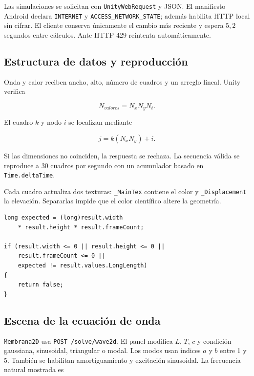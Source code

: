 Las simulaciones se solicitan con \texttt{UnityWebRequest} y JSON. El manifiesto
Android declara \texttt{INTERNET} y \texttt{ACCESS\_NETWORK\_STATE}; además habilita
HTTP local sin cifrar. El cliente conserva únicamente el cambio más reciente y espera
$5{,}2$ segundos entre cálculos. Ante HTTP 429 reintenta automáticamente.

\subsection{Estructura de datos y reproducción}

Onda y calor reciben ancho, alto, número de cuadros y un arreglo lineal. Unity verifica

\begin{equation}
N_{valores}=N_xN_yN_t.
\end{equation}

El cuadro $k$ y nodo $i$ se localizan mediante

\begin{equation}
j=k(N_xN_y)+i.
\end{equation}

Si las dimensiones no coinciden, la respuesta se rechaza. La secuencia válida se
reproduce a 30 cuadros por segundo con un acumulador basado en
\texttt{Time.\allowbreak deltaTime}.

Cada cuadro actualiza dos texturas: \texttt{\_MainTex} contiene el color y
\texttt{\_Displacement} la elevación. Separarlas impide que el color científico altere
la geometría.

\begin{lstlisting}[style=csharp, caption={Validación de una grilla recibida.}]
long expected = (long)result.width
    * result.height * result.frameCount;

if (result.width <= 0 || result.height <= 0 ||
    result.frameCount <= 0 ||
    expected != result.values.LongLength)
{
    return false;
}
\end{lstlisting}

\subsection{Escena de la ecuación de onda}

\texttt{Membrana2D} usa \texttt{POST /solve/wave2d}. El panel modifica $L$, $T$, $c$
y condición gaussiana, sinusoidal, triangular o modal. Los modos usan índices $a$ y
$b$ entre 1 y 5. También se habilitan amortiguamiento y excitación sinusoidal. La
frecuencia natural mostrada es

